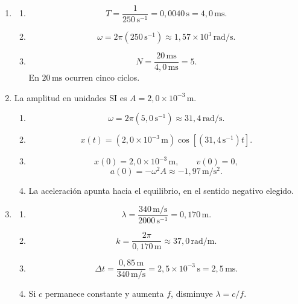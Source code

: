\begin{enumerate}[label=\textbf{G\arabic*.},leftmargin=*]
    \item
    \begin{enumerate}[label=\alph*)]
        \item
        \[
            T=\frac{1}{250\,\text{s}^{-1}}
              =0{,}0040\,\text{s}
              =4{,}0\,\text{ms}.
        \]
        \item
        \[
            \omega=2\pi(250\,\text{s}^{-1})
                   \approx1{,}57\times10^{3}\,\text{rad}/\text{s}.
        \]
        \item
        \[
            N=\frac{20\,\text{ms}}{4{,}0\,\text{ms}}=5.
        \]
        En \(20\,\text{ms}\) ocurren cinco ciclos.
    \end{enumerate}

    \item La amplitud en unidades SI es
    \(A=2{,}0\times10^{-3}\,\text{m}\).
    \begin{enumerate}[label=\alph*)]
        \item
        \[
            \omega=2\pi(5{,}0\,\text{s}^{-1})
                   \approx31{,}4\,\text{rad}/\text{s}.
        \]
        \item
        \[
            x(t)
            =(2{,}0\times10^{-3}\,\text{m})
            \cos\left[(31{,}4\,\text{s}^{-1})t\right].
        \]
        \item
        \[
            x(0)=2{,}0\times10^{-3}\,\text{m},
            \qquad v(0)=0,
        \]
        \[
            a(0)=-\omega^{2}A
              \approx-1{,}97\,\text{m}/\text{s}^{2}.
        \]
        \item La aceleración apunta hacia el equilibrio, en el sentido
        negativo elegido.
    \end{enumerate}

    \item
    \begin{enumerate}[label=\alph*)]
        \item
        \[
            \lambda
              =\frac{340\,\text{m}/\text{s}}
                     {2000\,\text{s}^{-1}}
              =0{,}170\,\text{m}.
        \]
        \item
        \[
            k=\frac{2\pi}{0{,}170\,\text{m}}
              \approx37{,}0\,\text{rad}/\text{m}.
        \]
        \item
        \[
            \Delta t
              =\frac{0{,}85\,\text{m}}{340\,\text{m}/\text{s}}
              =2{,}5\times10^{-3}\,\text{s}
              =2{,}5\,\text{ms}.
        \]
        \item Si \(c\) permanece constante y aumenta \(f\), disminuye
        \(\lambda=c/f\).
    \end{enumerate}


\end{enumerate}
